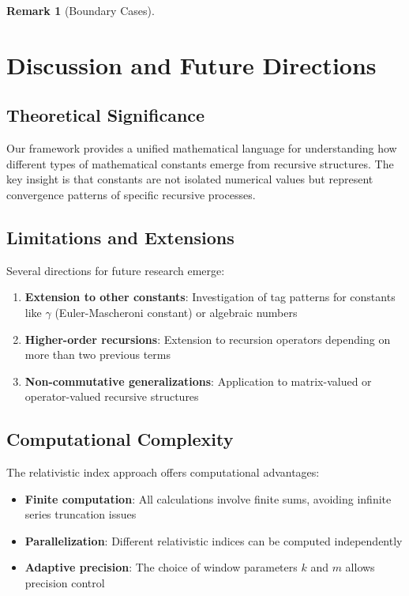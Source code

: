 \documentclass[12pt]{article}
\theoremstyle{plain}
\theoremstyle{definition}
\newtheorem{remark}[theorem]{Remark}
\begin{document}
\begin{remark}[Boundary Cases]
\section{Discussion and Future Directions}

\subsection{Theoretical Significance}

Our framework provides a unified mathematical language for understanding how different types of mathematical constants emerge from recursive structures. The key insight is that constants are not isolated numerical values but represent convergence patterns of specific recursive processes.

\subsection{Limitations and Extensions}

Several directions for future research emerge:

\begin{enumerate}
\item \textbf{Extension to other constants}: Investigation of tag patterns for constants like $\gamma$ (Euler-Mascheroni constant) or algebraic numbers
\item \textbf{Higher-order recursions}: Extension to recursion operators depending on more than two previous terms
\item \textbf{Non-commutative generalizations}: Application to matrix-valued or operator-valued recursive structures
\end{enumerate}

\subsection{Computational Complexity}

The relativistic index approach offers computational advantages:
\begin{itemize}
\item \textbf{Finite computation}: All calculations involve finite sums, avoiding infinite series truncation issues
\item \textbf{Parallelization}: Different relativistic indices can be computed independently
\item \textbf{Adaptive precision}: The choice of window parameters $k$ and $m$ allows precision control
\end{itemize}


\end{remark}
\end{document}
